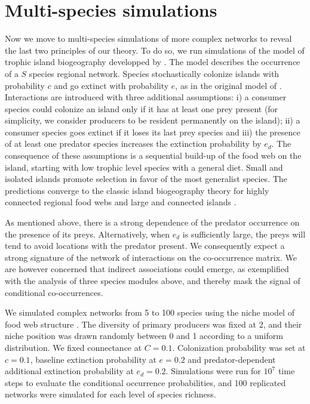 \section*{Multi-species simulations}
\label{multi}

Now we move to multi-species simulations of more complex networks to reveal the
last two principles of our theory. To do so, we run simulations of the model of
trophic island biogeography developped by \cite{Gravel2011}. The model
describes the occurrence of a $S$ species regional network. Species stochastically
colonize islands with probability $c$ and go extinct with probability $e$, as in
the original model of \cite{MacArthur1967}. Interactions are introduced with
three additional assumptions: i) a consumer species could colonize an island
only if it has at least one prey present (for simplicity, we consider producers
to be resident permanently on the island); ii) a consumer species goes extinct
if it loses its last prey species and iii) the presence of at least one predator
species increases the extinction probability by $e_d$. The consequence of these
assumptions is a sequential build-up of the food web on the island, starting
with low trophic level species with a general diet. Small and isolated islands
promote selection in favor of the most generalist species. The predictions
converge to the classic island biogeography theory for highly connected regional
food webs and large and connected islands \citep[details in][]{Gravel2011}.

As mentioned above, there is a strong dependence of the predator
occurrence on the presence of its preys. Alternatively, when $e_d$ is
sufficiently large, the preys will tend to avoid locations with the predator
present. We consequently expect a strong signature of the network of
interactions on the co-occurrence matrix. We are however concerned that
indirect associations could emerge, as exemplified with the analysis of three
species modules above, and thereby mask the signal of conditional co-occurrences.

We simulated complex networks from 5 to 100 species using the niche model of
food web structure \citep{Williams2000}. The diversity of primary
producers was fixed at 2, and their niche position was drawn randomly between
0 and 1 according to a uniform distribution. We fixed connectance at $C =
0.1$. Colonization probability was set at $c = 0.1$, baseline extinction
probability at $e = 0.2$ and predator-dependent additional extinction
probability at $e_d = 0.2$. Simulations were run for $10^7$ time steps to
evaluate the conditional occurrence probabilities, and 100 replicated networks
were simulated for each level of species richness.


